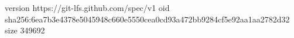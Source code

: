 version https://git-lfs.github.com/spec/v1
oid sha256:6ea7b3e4378e5045948c660e5550cea0cd93a472bb9284cf5e92aa1aa2782d32
size 349692
